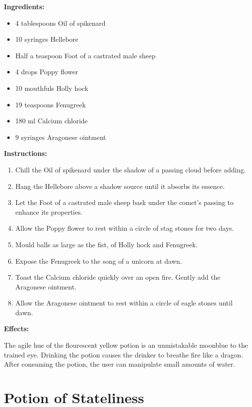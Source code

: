 \documentclass{article}
\begin{document}
\textbf{Ingredients:}

\begin{itemize}
  \item 4 tablespoons Oil of spikenard
  \item 10 syringes Hellebore
  \item Half a teaspoon Foot of a castrated male sheep
  \item 4 drops Poppy flower
  \item 10 mouthfuls Holly hock
  \item 19 teaspoons Fenugreek
  \item 180 ml Calcium chloride
  \item 9 syringes Aragonese ointment
\end{itemize}

\textbf{Instructions:}

\begin{enumerate}
  \item Chill the Oil of spikenard under the shadow of a passing cloud before adding.
  \item Hang the Hellebore above a shadow source until it absorbs its essence.
  \item Let the Foot of a castrated male sheep bask under the comet’s passing to enhance its properties.
  \item Allow the Poppy flower to rest within a circle of stag stones for two days.
  \item Mould balls as large as the fist, of Holly hock and Fenugreek.
  \item Expose the Fenugreek to the song of a unicorn at dawn.
  \item Toast the Calcium chloride quickly over an open fire. Gently add the Aragonese ointment.
  \item Allow the Aragonese ointment to rest within a circle of eagle stones until dawn.
\end{enumerate}

\textbf{Effects:}

The agile hue of the flourescent yellow potion is an unmistakable moonblue to the trained eye. Drinking the potion causes the drinker to breathe fire like a dragon. After consuming the potion, the user can manipulate small amounts of water.

\newpage
\section*{Potion of Stateliness}
\end{document}
